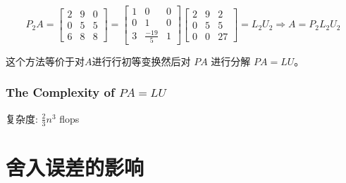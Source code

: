 \begin{example}[$PA=LU$]
    \begin{equation} P_{2} A=\left[\begin{array}{lll}2 & 9 & 0 \\ 0 & 5 & 5 \\ 6 & 8 & 8\end{array}\right]=\left[\begin{array}{ccc}1 & 0 & 0 \\ 0 & 1 & 0 \\ 3 & \frac{-19}{5} & 1\end{array}\right]\left[\begin{array}{ccc}2 & 9 & 2 \\ 0 & 5 & 5 \\ 0 & 0 & 27\end{array}\right]=L_{2} U_{2} \Rightarrow A=P_{2} L_{2} U_{2} \end{equation}

\end{example}


\begin{theorem}
    这个方法等价于对$A$进行行初等变换然后对 $ P A $ 进行分解 $ P A=L U $。
\end{theorem}

\subsubsection{The Complexity of $PA = LU$}

复杂度: $ \frac{2}{3} n^{3} $ flops



\section{舍入误差的影响}

